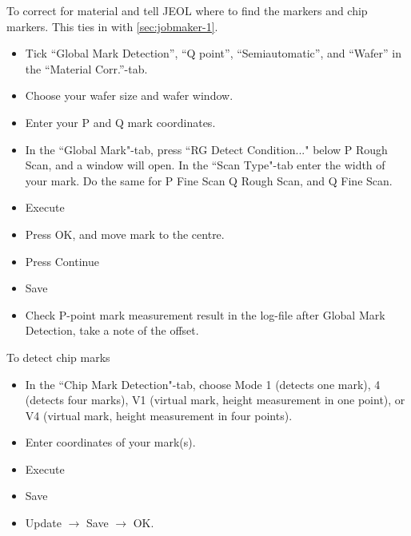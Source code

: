 To correct for  material and tell JEOL where to  find the markers and
chip markers. This ties in with \autoref{sec:jobmaker-1}.
\begin{itemize}
\item Tick ``Global Mark Detection'', ``Q point'', ``Semiautomatic'',
  and ``Wafer'' in the ``Material Corr.''-tab.
\item Choose your wafer size and wafer window. %
\item Enter your P and Q mark coordinates.
\item  In the  ``Global  Mark"-tab, press  ``RG Detect  Condition..."
  below  P  Rough Scan,  and  a  window  will  open.  In  the  ``Scan
  Type"-tab enter  the width of  your mark.  Do  the same for  P Fine
  Scan Q Rough Scan, and Q Fine Scan.
\item Execute
\item Press OK, and move mark to the centre.
\item Press Continue
\item Save
\item Check  P-point mark  measurement result  in the  log-file after
  Global Mark Detection, take a note of the offset.
\end{itemize}
To detect chip marks
\begin{itemize}
\item In the  ``Chip Mark Detection"-tab, choose Mode  1 (detects one
  mark), 4 (detects four marks), V1 (virtual mark, height measurement
  in  one point),  or V4  (virtual mark,  height measurement  in four
  points).
\item Enter coordinates of your mark(s).
\item Execute
\item Save
\item Update $\rightarrow$ Save $\rightarrow$ OK.
\end{itemize}

